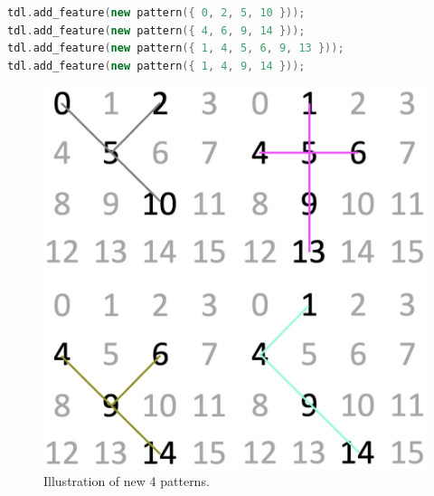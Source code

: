 \begin{enumerate}
\begin{lstlisting}[language=C++, caption={C++ code of new 4 patterns.}, label={patterns-new}]
tdl.add_feature(new pattern({ 0, 2, 5, 10 }));
tdl.add_feature(new pattern({ 4, 6, 9, 14 }));
tdl.add_feature(new pattern({ 1, 4, 5, 6, 9, 13 }));
tdl.add_feature(new pattern({ 1, 4, 9, 14 }));\end{lstlisting}
\begin{figure}[H]
	\centering
	\includegraphics[scale=0.4]{img/patterns-new-illustration.png}
	\caption{Illustration of new 4 patterns.}
	\label{patterns-new-illustration}
\end{figure}
\end{enumerate}
